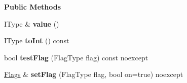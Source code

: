 \begin{Indent}\textbf{ Public Methods}\par
\begin{DoxyCompactItemize}
\item 
\mbox{\label{classrev_1_1_flags_ab2053a9f5ba4a0eb13f34eb34b30dfc4}} 
I\+Type \& {\bfseries value} ()
\item 
\mbox{\label{classrev_1_1_flags_a6ce7475335e1a1495fe7e6a96a2a7439}} 
I\+Type {\bfseries to\+Int} () const
\item 
\mbox{\label{classrev_1_1_flags_aa7437dd9a4feef1e3599ae8875f96849}} 
bool {\bfseries test\+Flag} (Flag\+Type flag) const noexcept
\item 
\mbox{\label{classrev_1_1_flags_a0ad659588a0d63eac58f4a6fb6e668d2}} 
\mbox{\hyperlink{classrev_1_1_flags}{Flags}} \& {\bfseries set\+Flag} (Flag\+Type flag, bool on=true) noexcept
\end{DoxyCompactItemize}
\end{Indent}
